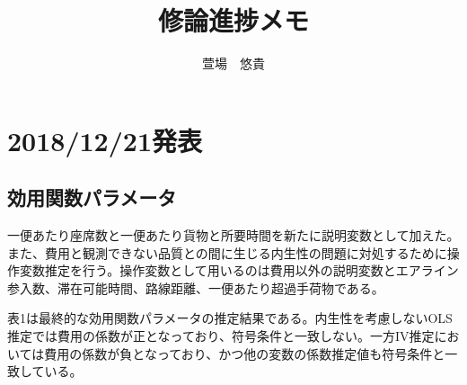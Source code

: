 \documentclass{jsarticle}
\begin{document}
\title{修論進捗メモ}
\author{萱場　悠貴}
\maketitle

\section{2018/12/21発表}
\subsection{効用関数パラメータ}

一便あたり座席数と一便あたり貨物と所要時間を新たに説明変数として加えた。また、費用と観測できない品質との間に生じる内生性の問題に対処するために操作変数推定を行う。操作変数として用いるのは費用以外の説明変数とエアライン参入数、滞在可能時間、路線距離、一便あたり超過手荷物である。


表1は最終的な効用関数パラメータの推定結果である。内生性を考慮しないOLS推定では費用の係数が正となっており、符号条件と一致しない。一方IV推定においては費用の係数が負となっており、かつ他の変数の係数推定値も符号条件と一致している。
\end{document}

